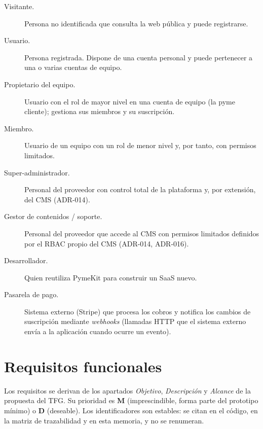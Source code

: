 \begin{description}
  \item[Visitante.] Persona no identificada que consulta la web pública y
        puede registrarse.
  \item[Usuario.] Persona registrada. Dispone de una cuenta personal y puede
        pertenecer a una o varias cuentas de equipo.
  \item[Propietario del equipo.] Usuario con el rol de mayor nivel en una
        cuenta de equipo (la pyme cliente); gestiona sus miembros y su
        suscripción.
  \item[Miembro.] Usuario de un equipo con un rol de menor nivel y, por
        tanto, con permisos limitados.
  \item[Super-administrador.] Personal del proveedor con control total de la
        plataforma y, por extensión, del CMS (ADR-014).
  \item[Gestor de contenidos / soporte.] Personal del proveedor que accede al
        CMS con permisos limitados definidos por el RBAC propio del CMS
        (ADR-014, ADR-016).
  \item[Desarrollador.] Quien reutiliza PymeKit para construir un SaaS nuevo.
  \item[Pasarela de pago.] Sistema externo (Stripe) que procesa los cobros y
        notifica los cambios de suscripción mediante \textit{webhooks}
        (llamadas HTTP que el sistema externo envía a la aplicación cuando
        ocurre un evento).
\end{description}

\section{Requisitos funcionales}
\label{sec:rf}

Los requisitos se derivan de los apartados \emph{Objetivo}, \emph{Descripción}
y \emph{Alcance} de la propuesta del TFG. Su prioridad es \textbf{M}
(imprescindible, forma parte del prototipo mínimo) o \textbf{D} (deseable).
Los identificadores son estables: se citan en el código, en la matriz de
trazabilidad y en esta memoria, y no se renumeran.


